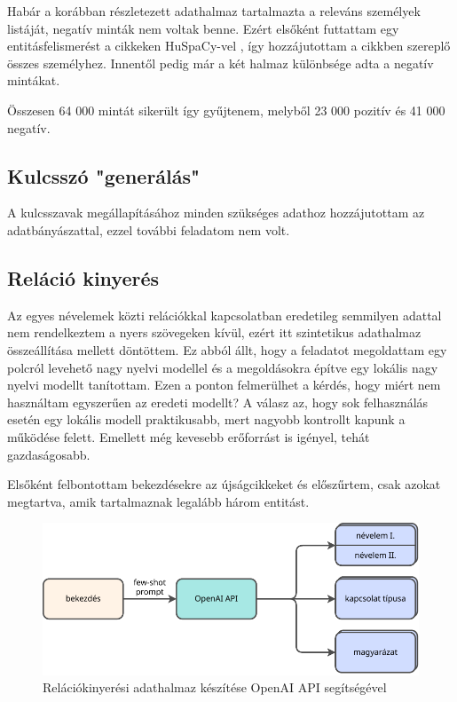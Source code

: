 Habár a korábban részletezett adathalmaz tartalmazta a releváns személyek listáját, negatív minták nem voltak benne. Ezért elsőként futtattam egy entitásfelismerést a cikkeken HuSpaCy-vel \cite{huspacy}, így hozzájutottam a cikkben szereplő összes személyhez. Innentől pedig már a két halmaz különbsége adta a negatív mintákat.

Összesen 64 000 mintát sikerült így gyűjtenem, melyből 23 000 pozitív és 41 000 negatív.

\subsection{Kulcsszó "generálás"}

A kulcsszavak megállapításához minden szükséges adathoz hozzájutottam az adatbányászattal, ezzel további feladatom nem volt.

\subsection{Reláció kinyerés}

Az egyes névelemek közti relációkkal kapcsolatban eredetileg semmilyen adattal nem rendelkeztem a nyers szövegeken kívül, ezért itt szintetikus adathalmaz összeállítása mellett döntöttem. Ez abból állt, hogy a feladatot megoldattam egy polcról levehető nagy nyelvi modellel és a megoldásokra építve egy lokális nagy nyelvi modellt tanítottam. Ezen a ponton felmerülhet a kérdés, hogy miért nem használtam egyszerűen az eredeti modellt? A válasz az, hogy sok felhasználás esetén egy lokális modell praktikusabb, mert nagyobb kontrollt kapunk a működése felett. Emellett még kevesebb erőforrást is igényel, tehát gazdaságosabb.

Elsőként felbontottam bekezdésekre az újságcikkeket és előszűrtem, csak azokat megtartva, amik tartalmaznak legalább három entitást.

\begin{figure}[H]
	\centering
	\includegraphics[width=1\textwidth]{figures/re-dataset.pdf}
	\caption{Relációkinyerési adathalmaz készítése OpenAI API segítségével}
\end{figure}

